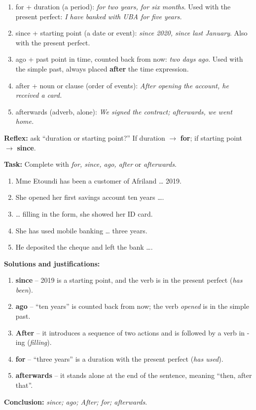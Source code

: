 \documentclass[11pt]{article}
\newcommand{\cle}[1]{{\popxbold\color{popdark}#1}}
\begin{document}
\begin{methode}
\begin{enumerate}
\item \cle{for} + duration (a period): \emph{for two years, for six months}. Used with the present perfect: \emph{I have banked with UBA for five years.}
\item \cle{since} + starting point (a date or event): \emph{since 2020, since last January}. Also with the present perfect.
\item \cle{ago} + past point in time, counted back from now: \emph{two days ago}. Used with the simple past, always placed \textbf{after} the time expression.
\item \cle{after} + noun or clause (order of events): \emph{After opening the account, he received a card.}
\item \cle{afterwards} (adverb, alone): \emph{We signed the contract; afterwards, we went home.}
\end{enumerate}
\textbf{Reflex:} ask ``duration or starting point?'' If duration $\rightarrow$ \textbf{for}; if starting point $\rightarrow$ \textbf{since}.
\end{methode}

\begin{exoresolu}
\textbf{Task:} Complete with \emph{for, since, ago, after} or \emph{afterwards}.
\begin{enumerate}
\item Mme Etoundi has been a customer of Afriland \dots{} 2019.
\item She opened her first savings account ten years \dots{}.
\item \dots{} filling in the form, she showed her ID card.
\item She has used mobile banking \dots{} three years.
\item He deposited the cheque and left the bank \dots{}.
\end{enumerate}
\tcblower
\textbf{Solutions and justifications:}
\begin{enumerate}
\item \textbf{since} -- 2019 is a starting point, and the verb is in the present perfect (\emph{has been}).
\item \textbf{ago} -- ``ten years'' is counted back from now; the verb \emph{opened} is in the simple past.
\item \textbf{After} -- it introduces a sequence of two actions and is followed by a verb in -ing (\emph{filling}).
\item \textbf{for} -- ``three years'' is a duration with the present perfect (\emph{has used}).
\item \textbf{afterwards} -- it stands alone at the end of the sentence, meaning ``then, after that''.
\end{enumerate}
\textbf{Conclusion:} \emph{since; ago; After; for; afterwards}.
\end{exoresolu}
\end{document}

